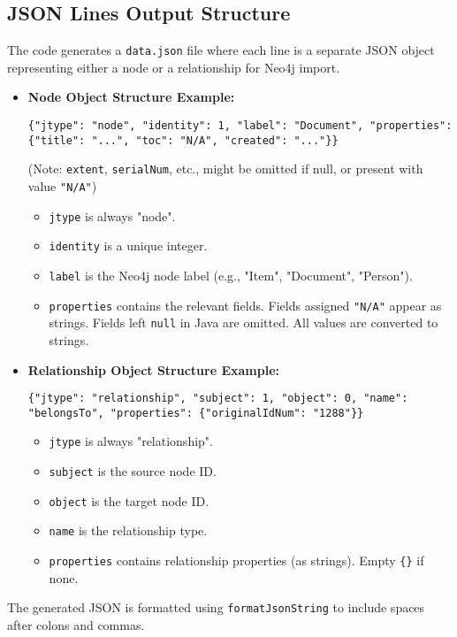\documentclass[11pt, a4paper]{article}
\begin{document}
\subsection*{JSON Lines Output Structure}
The code generates a \texttt{data.json} file where each line is a separate JSON object representing either a node or a relationship for Neo4j import.

\begin{itemize}
    \item \textbf{Node Object Structure Example:}
    \begin{lstlisting}[breaklines=true]
    {"jtype": "node", "identity": 1, "label": "Document", "properties": {"title": "...", "toc": "N/A", "created": "..."}}
    \end{lstlisting}
     (Note: \texttt{extent}, \texttt{serialNum}, etc., might be omitted if null, or present with value \texttt{"N/A"})
    \begin{itemize}
            \item \texttt{jtype} is always "node".
            \item \texttt{identity} is a unique integer.
            \item \texttt{label} is the Neo4j node label (e.g., "Item", "Document", "Person").
            \item \texttt{properties} contains the relevant fields. Fields assigned \texttt{"N/A"} appear as strings. Fields left \texttt{null} in Java are omitted. All values are converted to strings.
        \end{itemize}

    \item \textbf{Relationship Object Structure Example:}
    \begin{lstlisting}[breaklines=true]
    {"jtype": "relationship", "subject": 1, "object": 0, "name": "belongsTo", "properties": {"originalIdNum": "1288"}}
    \end{lstlisting}
    \begin{itemize}
            \item \texttt{jtype} is always "relationship".
            \item \texttt{subject} is the source node ID.
            \item \texttt{object} is the target node ID.
            \item \texttt{name} is the relationship type.
            \item \texttt{properties} contains relationship properties (as strings). Empty \texttt{\{\}} if none.
        \end{itemize}
\end{itemize}
The generated JSON is formatted using \texttt{formatJsonString} to include spaces after colons and commas.
\end{document}
